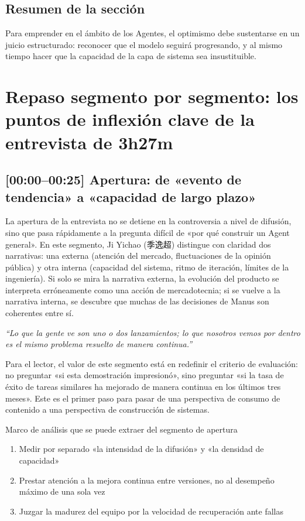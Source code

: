 \documentclass[a4paper]{article}
\begin{document}
\subsection{Resumen de la sección}

Para emprender en el ámbito de los Agentes, el optimismo debe sustentarse en un juicio estructurado: reconocer que el modelo seguirá progresando, y al mismo tiempo hacer que la capacidad de la capa de sistema sea insustituible.

\section{Repaso segmento por segmento: los puntos de inflexión clave de la entrevista de 3h27m}

\subsection{[00:00--00:25] Apertura: de «evento de tendencia» a «capacidad de largo plazo»}

La apertura de la entrevista no se detiene en la controversia a nivel de difusión, sino que pasa rápidamente a la pregunta difícil de «por qué construir un Agent general». En este segmento, Ji Yichao (季逸超) distingue con claridad dos narrativas: una externa (atención del mercado, fluctuaciones de la opinión pública) y otra interna (capacidad del sistema, ritmo de iteración, límites de la ingeniería). Si solo se mira la narrativa externa, la evolución del producto se interpreta erróneamente como una acción de mercadotecnia; si se vuelve a la narrativa interna, se descubre que muchas de las decisiones de Manus son coherentes entre sí.

\textit{``Lo que la gente ve son uno o dos lanzamientos; lo que nosotros vemos por dentro es el mismo problema resuelto de manera continua.''}

Para el lector, el valor de este segmento está en redefinir el criterio de evaluación: no preguntar «si esta demostración impresionó», sino preguntar «si la tasa de éxito de tareas similares ha mejorado de manera continua en los últimos tres meses». Este es el primer paso para pasar de una perspectiva de consumo de contenido a una perspectiva de construcción de sistemas.

\begin{knowledgebox}{Marco de análisis que se puede extraer del segmento de apertura}
\begin{enumerate}
    \item Medir por separado «la intensidad de la difusión» y «la densidad de capacidad»
    \item Prestar atención a la mejora continua entre versiones, no al desempeño máximo de una sola vez
    \item Juzgar la madurez del equipo por la velocidad de recuperación ante fallas
\end{enumerate}
\end{knowledgebox}
\end{document}
